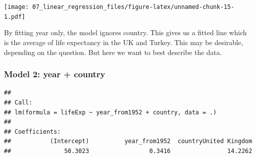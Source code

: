 \documentclass[12pt,]{krantz}
\makeatletter
\newenvironment{Shaded}{\begin{snugshade}}{\end{snugshade}}
\newcommand{\DataTypeTok}[1]{\textcolor[rgb]{0.13,0.29,0.53}{#1}}
\newcommand{\KeywordTok}[1]{\textcolor[rgb]{0.13,0.29,0.53}{\textbf{#1}}}
\newcommand{\NormalTok}[1]{#1}
\newcommand{\OperatorTok}[1]{\textcolor[rgb]{0.81,0.36,0.00}{\textbf{#1}}}
\newcommand{\StringTok}[1]{\textcolor[rgb]{0.31,0.60,0.02}{#1}}
\newenvironment{kframe}{%
\medskip{}
\setlength{\fboxsep}{.8em}
 \def\at@end@of@kframe{}%
 \ifinner\ifhmode%
  \def\at@end@of@kframe{\end{minipage}}%
  \begin{minipage}{\columnwidth}%
 \fi\fi%
 \def\FrameCommand##1{\hskip\@totalleftmargin \hskip-\fboxsep
 \colorbox{shadecolor}{##1}\hskip-\fboxsep
     \hskip-\linewidth \hskip-\@totalleftmargin \hskip\columnwidth}%
 \MakeFramed {\advance\hsize-\width
   \@totalleftmargin\z@ \linewidth\hsize
   \@setminipage}}%
 {\par\unskip\endMakeFramed%
 \at@end@of@kframe}
\renewenvironment{Shaded}{\begin{kframe}}{\end{kframe}}
\theoremstyle{definition}
\theoremstyle{definition}
\theoremstyle{definition}
\theoremstyle{remark}
\makeatother
\begin{document}
\texttt{[image: 07\_linear\_regression\_files/figure-latex/unnamed-chunk-15-1.pdf]}

By fitting year only, the model ignores country. This gives us a fitted
line which is the average of life expectancy in the UK and Turkey. This
may be desirable, depending on the question. But here we want to best
describe the data.

\hypertarget{model-2-year-country}{%
\subsubsection{Model 2: year + country}\label{model-2-year-country}}

\begin{Shaded}
\end{Shaded}

\begin{verbatim}
## 
## Call:
## lm(formula = lifeExp ~ year_from1952 + country, data = .)
## 
## Coefficients:
##           (Intercept)          year_from1952  countryUnited Kingdom  
##               50.3023                 0.3416                14.2262
\end{verbatim}

\begin{Shaded}
\end{Shaded}
\end{document}
